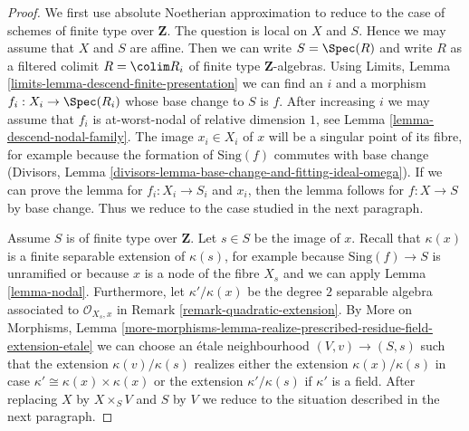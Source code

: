 \begin{proof}
We first use absolute Noetherian approximation to reduce to the
case of schemes of finite type over $\mathbf{Z}$.
The question is local on $X$ and $S$. Hence we may assume that
$X$ and $S$ are affine. Then we can write $S = \Spec(R)$
and write $R$ as a filtered colimit $R = \colim R_i$
of finite type $\mathbf{Z}$-algebras.
Using Limits, Lemma \ref{limits-lemma-descend-finite-presentation}
we can find an $i$ and a morphism $f_i : X_i \to \Spec(R_i)$ whose base
change to $S$ is $f$. After increasing $i$ we may assume that $f_i$
is at-worst-nodal of relative dimension $1$, see
Lemma \ref{lemma-descend-nodal-family}.
The image $x_i \in X_i$ of $x$ will be a singular
point of its fibre, for example because the formation of
$\text{Sing}(f)$ commutes with base change (Divisors, Lemma
\ref{divisors-lemma-base-change-and-fitting-ideal-omega}).
If we can prove the lemma for $f_i : X_i \to S_i$ and
$x_i$, then the lemma follows for $f : X \to S$ by base
change. Thus we reduce to the case studied in the next
paragraph.

\medskip\noindent
Assume $S$ is of finite type over $\mathbf{Z}$. Let $s \in S$ be the
image of $x$. Recall that $\kappa(x)$ is a finite separable extension
of $\kappa(s)$, for example because $\text{Sing}(f) \to S$
is unramified or because $x$ is a node of the fibre $X_s$
and we can apply Lemma \ref{lemma-nodal}.
Furthermore, let $\kappa'/\kappa(x)$ be the
degree $2$ separable algebra associated to $\mathcal{O}_{X_s, x}$ in
Remark \ref{remark-quadratic-extension}.
By More on Morphisms, Lemma
\ref{more-morphisms-lemma-realize-prescribed-residue-field-extension-etale}
we can choose an \'etale neighbourhood $(V, v) \to (S, s)$
such that the extension $\kappa(v)/\kappa(s)$ realizes either
the extension $\kappa(x)/\kappa(s)$ in case
$\kappa' \cong \kappa(x) \times \kappa(x)$ or
the extension $\kappa'/\kappa(s)$ if $\kappa'$ is a field.
After replacing $X$ by $X \times_S V$ and $S$ by $V$
we reduce to the situation described in the next paragraph.


\end{proof}
